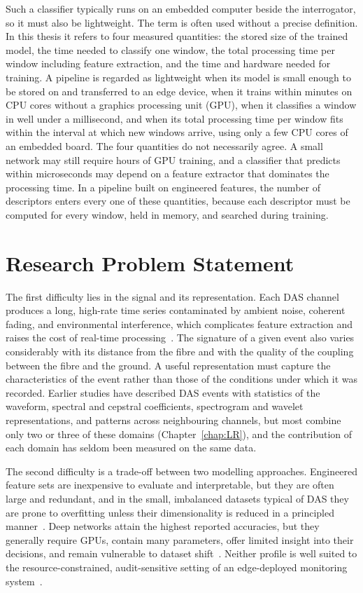 Such a classifier typically runs on an embedded computer beside the interrogator, so it must also be lightweight. The term is often used without a precise definition. In this thesis it refers to four measured quantities: the stored size of the trained model, the time needed to classify one window, the total processing time per window including feature extraction, and the time and hardware needed for training. A pipeline is regarded as lightweight when its model is small enough to be stored on and transferred to an edge device, when it trains within minutes on CPU cores without a graphics processing unit (GPU), when it classifies a window in well under a millisecond, and when its total processing time per window fits within the interval at which new windows arrive, using only a few CPU cores of an embedded board. The four quantities do not necessarily agree. A small network may still require hours of GPU training, and a classifier that predicts within microseconds may depend on a feature extractor that dominates the processing time. In a pipeline built on engineered features, the number of descriptors enters every one of these quantities, because each descriptor must be computed for every window, held in memory, and searched during training.

\section{Research Problem Statement}
\label{sec:ResearchProblemStatement}
The first difficulty lies in the signal and its representation. Each DAS channel produces a long, high-rate time series contaminated by ambient noise, coherent fading, and environmental interference, which complicates feature extraction and raises the cost of real-time processing~\cite{huang2024noise}. The signature of a given event also varies considerably with its distance from the fibre and with the quality of the coupling between the fibre and the ground. A useful representation must capture the characteristics of the event rather than those of the conditions under which it was recorded. Earlier studies have described DAS events with statistics of the waveform, spectral and cepstral coefficients, spectrogram and wavelet representations, and patterns across neighbouring channels, but most combine only two or three of these domains (Chapter~\ref{chap:LR}), and the contribution of each domain has seldom been measured on the same data.

The second difficulty is a trade-off between two modelling approaches. Engineered feature sets are inexpensive to evaluate and interpretable, but they are often large and redundant, and in the small, imbalanced datasets typical of DAS they are prone to overfitting unless their dimensionality is reduced in a principled manner~\cite{wani2025dimensionality,guyon2003variable}. Deep networks attain the highest reported accuracies, but they generally require GPUs, contain many parameters, offer limited insight into their decisions, and remain vulnerable to dataset shift~\cite{shahabudin2025review,shi2025benchmarking}. Neither profile is well suited to the resource-constrained, audit-sensitive setting of an edge-deployed monitoring system~\cite{deng2025roadtraffic}.

